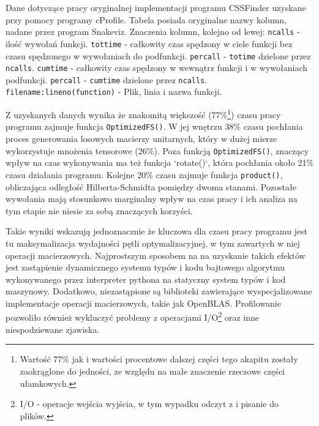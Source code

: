 \documentclass[11pt, a4paper]{article}
\newcommand{\code}[1]{\texttt{#1}}
\begin{document}
\begin{sloppypar}
    \FloatBarrier
    \begin{table}[ht]
      \tiny
      \centering
      
      \caption{Dane dotyczące pracy oryginalnej implementacji programu CSSFinder uzyskane przy pomocy programy cProfile. Tabela posiada oryginalne nazwy kolumn, nadane przez program Snakeviz. Znaczenia kolumn, kolejno od lewej: \code{ncalls} - ilość wywołań funkcji. \code{tottime} - całkowity czas spędzony w ciele funkcji bez czasu spędzonego w wywołaniach do podfunkcji. \code{percall} - \code{totime} dzielone przez \code{ncalls}. \code{cumtime} - całkowity czas spędzony w wewnątrz funkcji i w wywołaniach podfunkcji. \code{percall} - \code{cumtime} dzielone przez \code{ncalls}. \code{filename:lineno(function)} - Plik, linia i nazwa funkcji.}
    \end{table}
    \FloatBarrier

    Z uzyskanych danych wynika że znakomitą większość (77\%\footnote{Wartość 77\% jak i
    wartości procentowe dalszej części tego akapitu zostały zaokrąglone do jedności, ze względu
    na małe znaczenie rzeczowe części ułamkowych.}) czasu pracy programu zajmuje funkcja
    \code{OptimizedFS()}. W jej wnętrzu 38\% czasu pochłania proces generowania losowych
    macierzy unitarnych, który w dużej mierze wykorzystuje mnożenia tensorowe (26\%).
    Poza funkcją \code{OptimizedFS()}, znaczący wpływ na czas wykonywania ma też funkcja
    `rotate()`, która pochłania około 21\% czasu działania programu. Kolejne 20\% czasu
    zajmuje funkcja \code{product()}, obliczająca odległość Hilberta-Schmidta pomiędzy
    dwoma stanami. Pozostałe wywołania mają stosunkowo marginalny wpływ na czas pracy i ich
    analiza na tym etapie nie niesie za sobą znaczących korzyści.

    Takie wyniki wskazują jednoznacznie że kluczowa dla czasu pracy programu jest tu maksymalizacja
    wydajności pętli optymalizacyjnej, w tym zawartych w niej operacji macierzowych. Najprostszym
    sposobem na na uzyskanie takich efektów jest zastąpienie dynamicznego systemu typów i
    kodu bajtowego algorytmu wykonywanego przez interpreter pythona na statyczny system typów
    i kod maszynowy. Dodatkowo, niezastąpione są biblioteki zawierające wyspecjalizowane
    implementacje operacji macierzowych, takie jak OpenBLAS. Profilowanie pozwoliło również
    wykluczyć problemy z operacjami I/O\footnote{I/O - operacje wejścia wyjścia, w tym wypadku
    odczyt z i pisanie do plików.} oraz inne niespodziewane zjawiska.


\end{sloppypar}
\end{document}

